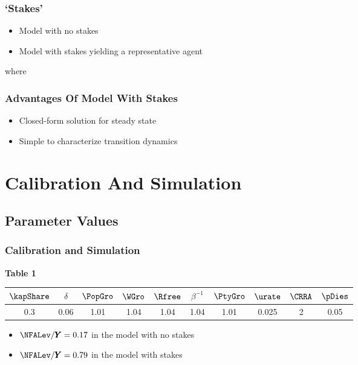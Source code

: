 \documentclass{beamer}
\renewcommand{\GDPLev}{\ensuremath{\pmb{Y}}}
\begin{document}
\begin{frame}\frametitle{`Stakes'}
\begin{itemize}
    \item Model with no stakes

    \item Model with stakes yielding a representative agent

\end{itemize}
where


\end{frame}

\begin{frame}\frametitle{Advantages Of Model With Stakes}

\begin{itemize}
   \item Closed-form solution for steady state
   \item Simple to characterize transition dynamics
\end{itemize}

\end{frame}



\section{Calibration And Simulation}
\subsection{Parameter Values}
\begin{frame}
\frametitle{Calibration and Simulation}


\centerline{\bf Table 1}

\begin{center}
\begin{tabular}{|c|c|c|c|c|c|c|c|c|c|}
  \hline
  $\kapShare$ & $\delta$ & $\PopGro$ & $\WGro$ & $\Rfree$ & $\beta^{-1}$ & $\PtyGro$ & $\urate$ & $\CRRA$ & $\pDies$ \\ \hline
  0.3 & 0.06 & 1.01 & 1.04 & 1.04 & 1.04 & 1.01 & 0.025 & 2 & 0.05 \\
  \hline
\end{tabular}
\end{center}

    \begin{itemize}
    \item ${\NFALev}/{\GDPLev}=0.17$ in the model with no stakes
    \item ${\NFALev}/{\GDPLev}=0.79$ in the model with stakes
    \end{itemize}

\end{frame}
\end{document}
